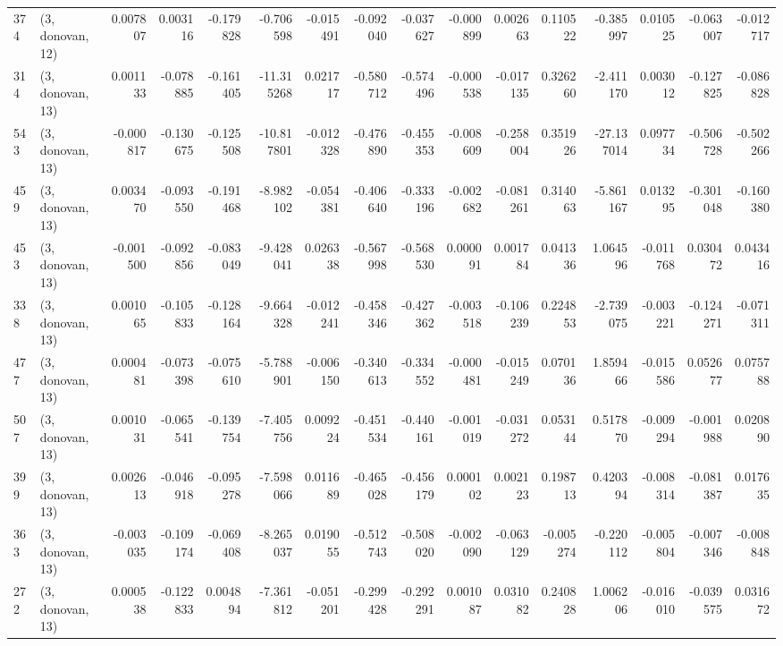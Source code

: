\begin{tabular}{llrrrrrrrrrrrrrr}
374 &  (3, donovan, 12) &   0.007807 &  0.003116 & -0.179828 &   -0.706598 & -0.015491 &  -0.092040 & -0.037627 & -0.000899 &  0.002663 &  0.110522 &   -0.385997 &  0.010525 & -0.063007 & -0.012717 \\
314 &  (3, donovan, 13) &   0.001133 & -0.078885 & -0.161405 &  -11.315268 &  0.021717 &  -0.580712 & -0.574496 & -0.000538 & -0.017135 &  0.326260 &   -2.411170 &  0.003012 & -0.127825 & -0.086828 \\
543 &  (3, donovan, 13) &  -0.000817 & -0.130675 & -0.125508 &  -10.817801 & -0.012328 &  -0.476890 & -0.455353 & -0.008609 & -0.258004 &  0.351926 &  -27.137014 &  0.097734 & -0.506728 & -0.502266 \\
459 &  (3, donovan, 13) &   0.003470 & -0.093550 & -0.191468 &   -8.982102 & -0.054381 &  -0.406640 & -0.333196 & -0.002682 & -0.081261 &  0.314063 &   -5.861167 &  0.013295 & -0.301048 & -0.160380 \\
453 &  (3, donovan, 13) &  -0.001500 & -0.092856 & -0.083049 &   -9.428041 &  0.026338 &  -0.567998 & -0.568530 &  0.000091 &  0.001784 &  0.041336 &    1.064596 & -0.011768 &  0.030472 &  0.043416 \\
338 &  (3, donovan, 13) &   0.001065 & -0.105833 & -0.128164 &   -9.664328 & -0.012241 &  -0.458346 & -0.427362 & -0.003518 & -0.106239 &  0.224853 &   -2.739075 & -0.003221 & -0.124271 & -0.071311 \\
477 &  (3, donovan, 13) &   0.000481 & -0.073398 & -0.075610 &   -5.788901 & -0.006150 &  -0.340613 & -0.334552 & -0.000481 & -0.015249 &  0.070136 &    1.859466 & -0.015586 &  0.052677 &  0.075788 \\
507 &  (3, donovan, 13) &   0.001031 & -0.065541 & -0.139754 &   -7.405756 &  0.009224 &  -0.451534 & -0.440161 & -0.001019 & -0.031272 &  0.053144 &    0.517870 & -0.009294 & -0.001988 &  0.020890 \\
399 &  (3, donovan, 13) &   0.002613 & -0.046918 & -0.095278 &   -7.598066 &  0.011689 &  -0.465028 & -0.456179 &  0.000102 &  0.002123 &  0.198713 &    0.420394 & -0.008314 & -0.081387 &  0.017635 \\
363 &  (3, donovan, 13) &  -0.003035 & -0.109174 & -0.069408 &   -8.265037 &  0.019055 &  -0.512743 & -0.508020 & -0.002090 & -0.063129 & -0.005274 &   -0.220112 & -0.005804 & -0.007346 & -0.008848 \\
272 &  (3, donovan, 13) &   0.000538 & -0.122833 &  0.004894 &   -7.361812 & -0.051201 &  -0.299428 & -0.292291 &  0.001087 &  0.031082 &  0.240828 &    1.006206 & -0.016010 & -0.039575 &  0.031672 \\

\end{tabular}

